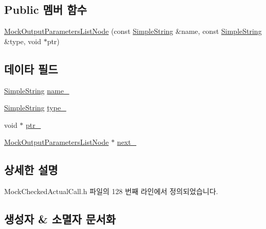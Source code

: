 \subsection*{Public 멤버 함수}
\begin{DoxyCompactItemize}
\item 
\hyperlink{class_mock_checked_actual_call_1_1_mock_output_parameters_list_node_a2267a18197f4695186d0cb437a0cfe16}{Mock\+Output\+Parameters\+List\+Node} (const \hyperlink{class_simple_string}{Simple\+String} \&name, const \hyperlink{class_simple_string}{Simple\+String} \&type, void $\ast$ptr)
\end{DoxyCompactItemize}
\subsection*{데이타 필드}
\begin{DoxyCompactItemize}
\item 
\hyperlink{class_simple_string}{Simple\+String} \hyperlink{class_mock_checked_actual_call_1_1_mock_output_parameters_list_node_aac73c86e1e892f392d1fc423e25f51a8}{name\+\_\+}
\item 
\hyperlink{class_simple_string}{Simple\+String} \hyperlink{class_mock_checked_actual_call_1_1_mock_output_parameters_list_node_ad41f1c1c681fbfc6ba0ef62ac34ac075}{type\+\_\+}
\item 
void $\ast$ \hyperlink{class_mock_checked_actual_call_1_1_mock_output_parameters_list_node_afbe2be78a3ee81b2e3c6821cec74e116}{ptr\+\_\+}
\item 
\hyperlink{class_mock_checked_actual_call_1_1_mock_output_parameters_list_node}{Mock\+Output\+Parameters\+List\+Node} $\ast$ \hyperlink{class_mock_checked_actual_call_1_1_mock_output_parameters_list_node_a48980b6753fe91ed89c1959b171615d6}{next\+\_\+}
\end{DoxyCompactItemize}


\subsection{상세한 설명}


Mock\+Checked\+Actual\+Call.\+h 파일의 128 번째 라인에서 정의되었습니다.



\subsection{생성자 \& 소멸자 문서화}
